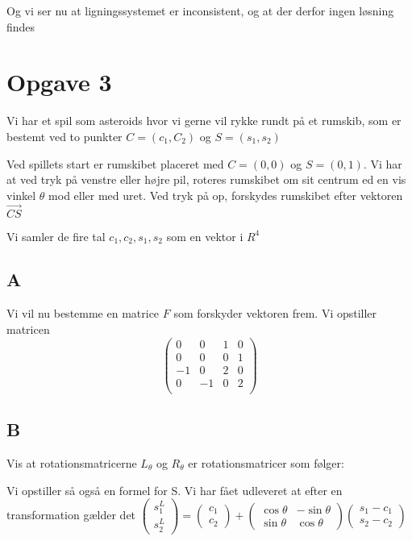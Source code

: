 \documentclass[11pt]{article}
\begin{document}
Og vi ser nu at ligningssystemet er inconsistent, og at der derfor ingen
løsning findes

    
    
    
\section{Opgave 3}

Vi har et spil som asteroids hvor vi gerne vil rykke rundt på et
rumskib, som er bestemt ved to punkter \(C = (c_1,C_2)\) og
\(S = (s_1, s_2)\)

Ved spillets start er rumskibet placeret med \(C = (0,0)\) og
\(S = (0,1)\). Vi har at ved tryk på venstre eller højre pil, roteres
rumskibet om sit centrum ed en vis vinkel \(\theta\) mod eller med uret.
Ved tryk på op, forskydes rumskibet efter vektoren \(\vec{CS}\)

    Vi samler de fire tal \(c_1,c_2,s_1,s_2\) som en vektor i \(R^4\)

    \hypertarget{a3}{%
\subsection{A}\label{a3}}

Vi vil nu bestemme en matrice \(F\) som forskyder vektoren frem. Vi
opstiller matricen \[\begin{pmatrix}
0&0&1&0\\
0&0&0&1\\
-1&0&2&0\\
0&-1&0&2\\
\end{pmatrix}\]

\hypertarget{b3}{%
\subsection{B}\label{b3}}

Vis at rotationsmatricerne \(L_\theta\) og \(R_\theta\) er
rotationsmatricer som følger:

    Vi opstiller så også en formel for S. Vi har fået udleveret at efter en
transformation gælder det
\(\begin{pmatrix}s^L_1\\ s^L_2\end{pmatrix} = \begin{pmatrix}c_1\\ c_2\end{pmatrix} + \begin{pmatrix}\cos\theta&-\sin\theta\\\sin\theta&\cos\theta\end{pmatrix}\begin{pmatrix}s_1-c_1\\ s_2-c_2\end{pmatrix}\)
\end{document}
